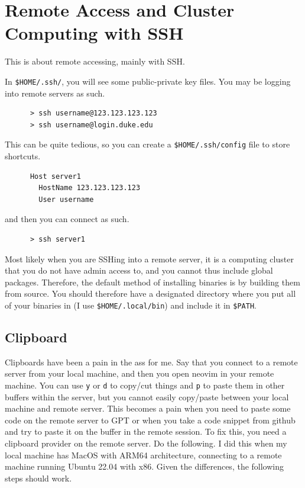 \section{Remote Access and Cluster Computing with SSH} 

  This is about remote accessing, mainly with SSH. 

  \begin{definition}
    \label{def:ssh-configuration-file}
    In \texttt{\$HOME/.ssh/}, you will see some public-private key files. You may be logging into remote servers as such. 

    \begin{lstlisting}
      > ssh username@123.123.123.123 
      > ssh username@login.duke.edu
    \end{lstlisting}

    This can be quite tedious, so you can create a \texttt{\$HOME/.ssh/config} file to store shortcuts. 
    \begin{lstlisting}
      Host server1
        HostName 123.123.123.123
        User username
    \end{lstlisting}
    and then you can connect as such. 
    \begin{lstlisting}
      > ssh server1
    \end{lstlisting}
  \end{definition}

  \begin{definition}
    \label{def:installing-packages-without-sudo}
    Most likely when you are SSHing into a remote server, it is a computing cluster that you do not have admin access to, and you cannot thus include global packages. Therefore, the default method of installing binaries is by building them from source. You should therefore have a designated directory where you put all of your binaries in (I use \texttt{\$HOME/.local/bin}) and include it in \texttt{\$PATH}. 
  \end{definition}

\subsection{Clipboard}

  Clipboards have been a pain in the ass for me. Say that you connect to a remote server from your local machine, and then you open neovim in your remote machine. You can use \texttt{y} or \texttt{d} to copy/cut things and \texttt{p} to paste them in other buffers within the server, but you cannot easily copy/paste between your local machine and remote server. This becomes a pain when you need to paste some code on the remote server to GPT or when you take a code snippet from github and try to paste it on the buffer in the remote session. To fix this, you need a clipboard provider on the remote server. Do the following. I did this when my local machine has MacOS with ARM64 architecture, connecting to a remote machine running Ubuntu 22.04 with x86. Given the differences, the following steps should work. 

